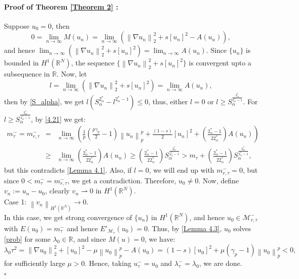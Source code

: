 \documentclass[11pt]{article}
\numberwithin{equation}{section}
\numberwithin{mytheorem}{section}
\newenvironment{myproof}[2] {\paragraph{Proof of {#1} {#2} :}}{\hfill$\square$}
\begin{document}
\begin{myproof}{Theorem}{\ref{Theorem 2}}
					Suppose $u_0=0$, then 
					$$0 = \lim_{n\rightarrow \infty}M(u_n) = \lim_{n\rightarrow \infty}\left(\left\| \nabla u_n \right\|_2^2+s[u_n]^2-A(u_n)\right),$$
					and hence $\displaystyle \lim_{n\rightarrow \infty}\left(\left\| \nabla u_n \right\|_2^2+s[u_n]^2\right)= \lim_{n\rightarrow \infty}A(u_n)$. Since $\{u_n\}$ is bounded in $H^1(\mathbb{R}^N)$, the sequence $\{\left\| \nabla u_n\right\|_2^2+s[u_n]^2\}$ is convergent upto a subsequence in $\mathbb{R}$.
					Now, let $$l=\displaystyle \lim_{n\rightarrow \infty}\left(\left\| \nabla u_n \right\|_2^2+s[u_n]^2\right)= \lim_{n\rightarrow \infty}A(u_n),$$
					then by \eqref{S_alpha}, we get $l(S_{\alpha}^{2^*_{\alpha}}-l^{2^*_{\alpha}-1})\leq 0$, thus, either $l=0$ or $l\geq S_{\alpha}^{\frac{2^*_{\alpha}}{2^*_{\alpha}-1}}$. For $l\geq S_{\alpha}^{\frac{2^*_{\alpha}}{2^*_{\alpha}-1}}$,  by \eqref{4.21} we get:
					\begin{eqnarray*}
						m_{\tau}^-=m_{r,\tau}^- & = & \lim_{n\rightarrow \infty}\left(\frac{1}{p}\left(\frac{p\gamma_p}{2}-1\right)\left\| u_n \right\|_p^p+\frac{(1-s)}{2}[u_n]^2+\left(\frac{2^*_{\alpha}-1}{22^*_{\alpha}}\right)A(u_n)\right)\\
						& \geq & \lim_{n\rightarrow \infty}\left(\frac{2^*_{\alpha}-1}{22^*_{\alpha}}\right)A(u_n)\geq \left(\frac{2^*_{\alpha}-1}{22^*_{\alpha}}\right)S_{\alpha}^{\frac{2^*_{\alpha}}{2^*_{\alpha}-1}}>m_{\tau}+\left(\frac{2^*_{\alpha}-1}{22^*_{\alpha}}\right)S_{\alpha}^{\frac{2^*_{\alpha}}{2^*_{\alpha}-1}},
					\end{eqnarray*}
					but this contradicts \autoref{Lemma 4.1}. Also, if $l=0$, we will end up with $m_{r,\tau}^-=0$, but since $0<m_{\tau}^-=m_{r,\tau}^-$, we get a contradiction. Therefore, $u_0\neq 0$. Now, define $v_n:=u_n-u_0$, clearly $v_n\rightharpoonup 0$ in $H^1(\mathbb{R}^N)$.\\
					Case 1: $\left\| v_n\right\|_{H^1(\mathbb{R}^N)}\rightarrow 0 $.\\
					In this case, we get strong convergence of $\{u_n\}$ in $H^1(\mathbb{R}^N)$, and hence $u_0\in \mathcal{M}_{r,\tau}^-$ with $E(u_0)=m_{\tau}^-$ and hence $E'_{\mathcal{M}_{\tau}}(u_0)=0$. Thus, by \autoref{Lemma 4.3}, $u_0$ solves \eqref{prob} for some $\lambda_0\in \mathbb{R}$, and since $M(u)=0$, we have:
					\begin{equation*}
						\lambda_0\tau^2  =  \left\| \nabla u_0 \right\|_2^2+[u_0]^2-\mu \left\| u_0 \right\|_p^p-A(u_0)= (1-s)[u_0]^2+\mu(\gamma_p-1)\left\| u_0 \right\|_p^p<0,
					\end{equation*}
					for sufficiently large $\mu>0$. Hence, taking $u_{\tau}^-=u_0$ and $\lambda_{\tau}^-=\lambda_0$, we are done.\\

\end{myproof}
\end{document}
